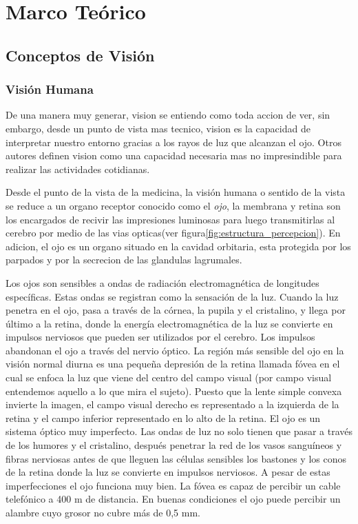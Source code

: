 \chapter{Marco Teórico}
\section{Conceptos de Visión}

\subsection{Visión Humana}
De una manera muy generar, vision se entiendo como toda accion de ver, sin embargo, desde un punto de vista mas tecnico, vision es la capacidad de interpretar nuestro entorno gracias a los rayos de luz que alcanzan el ojo. Otros autores definen vision como una capacidad necesaria mas no impresindible para realizar las actividades cotidianas.

Desde el punto de la vista de la medicina, la visión humana o sentido de la vista se reduce a un organo receptor conocido como el \textit{ojo}, la membrana y retina son los encargados de recivir las impresiones luminosas para luego transmitirlas al cerebro por medio de las vias opticas(ver figura\ref{fig:estructura_percepcion}). En adicion, el ojo es un organo situado en la cavidad orbitaria, esta protegida por los parpados y por la secrecion de las glandulas lagrumales. 

Los ojos son sensibles a ondas de radiación electromagnética de longitudes específicas. Estas ondas se registran como la sensación de la luz. Cuando la luz penetra en el ojo, pasa a través de la córnea, la pupila y el cristalino, y llega por último a la retina, donde la energía electromagnética de la luz se convierte en impulsos nerviosos que pueden ser utilizados por el cerebro. Los impulsos abandonan el ojo a través del nervio
óptico. La región más sensible del ojo en la visión normal diurna es una pequeña depresión de la retina llamada fóvea en el cual se enfoca la luz que viene del centro del campo visual (por campo visual entendemos aquello a lo que mira el sujeto). Puesto que la lente simple convexa invierte la imagen, el campo visual derecho es representado a la izquierda de la retina y el campo inferior representado en lo alto de la retina. El ojo es un sistema óptico muy imperfecto. Las ondas de luz no solo tienen que pasar a través de los humores y el cristalino, después penetrar la red de los vasos sanguíneos y fibras nerviosas antes de que lleguen las células sensibles los bastones y los conos de la retina donde la luz se convierte en impulsos nerviosos. A pesar de estas imperfecciones el ojo funciona muy bien. La fóvea es capaz de percibir un cable telefónico a 400 m de distancia. En buenas condiciones el ojo puede percibir un alambre cuyo grosor no cubre más de 0,5 mm.

